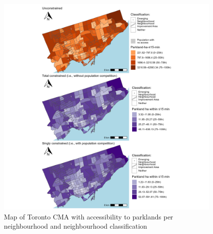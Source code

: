 \documentclass[
11pt, %
oneside, %
english, %
singlespacing, %
]{macthesis} %
\begin{document}
\begin{figure}

{\centering \includegraphics[width=6in]{./data/figures/chp4-parkland_access_neighbourhood_WALK_plots} 

}

\caption{\label{fig:chp4-parkland_access_neighbourhood_WALK_plots}Map of Toronto CMA with accessibility to parklands per neighbourhood and neighbourhood classification}\label{fig:unnamed-chunk-59}
\end{figure}
\end{document}
